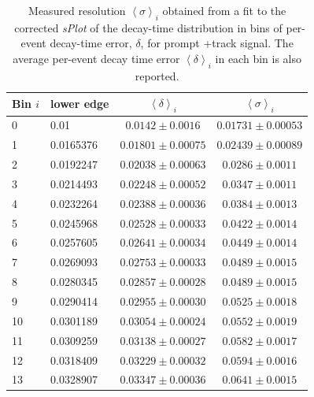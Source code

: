 \begin{table}[tbp]
	\centering
	\caption{Measured resolution $\left<\sigma\right>_{i}$ obtained from a fit to the \pt~corrected \emph{sPlot} of the decay-time distribution in bins of per-event decay-time error, $\delta$, for prompt \Dpm+track signal. The average per-event decay time error $\left<\delta\right>_{i}$ in each bin is also reported.
	\label{tab:resPedtefit}
	}
	\begin{tabular}{llcc}
		\toprule
		Bin $i$& lower edge & $\left<\delta\right>_{i}$ & $\left<\sigma\right>_{i}$ \\
		\midrule
		 0       &       0.01    &       $ 0.0142\pm 0.0016$     &       $ 0.01731\pm 0.00053$   \\
		  1       &       0.0165376       &       $ 0.01801\pm 0.00075$   &       $ 0.02439\pm 0.00089$   \\
		    2       &       0.0192247       &       $ 0.02038\pm 0.00063$   &       $ 0.0286\pm 0.0011$     \\
		    3       &       0.0214493       &       $ 0.02248\pm 0.00052$   &       $ 0.0347\pm 0.0011$     \\
		    4       &       0.0232264       &       $ 0.02388\pm 0.00036$   &       $ 0.0384\pm 0.0013$     \\
		    5       &       0.0245968       &       $ 0.02528\pm 0.00033$   &       $ 0.0422\pm 0.0014$     \\
		    6       &       0.0257605       &       $ 0.02641\pm 0.00034$   &       $ 0.0449\pm 0.0014$     \\
		    7       &       0.0269093       &       $ 0.02753\pm 0.00033$   &       $ 0.0489\pm 0.0015$     \\
		    8       &       0.0280345       &       $ 0.02857\pm 0.00028$   &       $ 0.0489\pm 0.0015$     \\
		    9       &       0.0290414       &       $ 0.02955\pm 0.00030$   &       $ 0.0525\pm 0.0018$     \\
		    10      &       0.0301189       &       $ 0.03054\pm 0.00024$   &       $ 0.0552\pm 0.0019$     \\
		    11      &       0.0309259       &       $ 0.03138\pm 0.00027$   &       $ 0.0582\pm 0.0017$     \\
		    12      &       0.0318409       &       $ 0.03229\pm 0.00032$   &       $ 0.0594\pm 0.0016$     \\
		    13      &       0.0328907       &       $ 0.03347\pm 0.00036$   &       $ 0.0641\pm 0.0015$     \\

\end{tabular}
\end{table}
